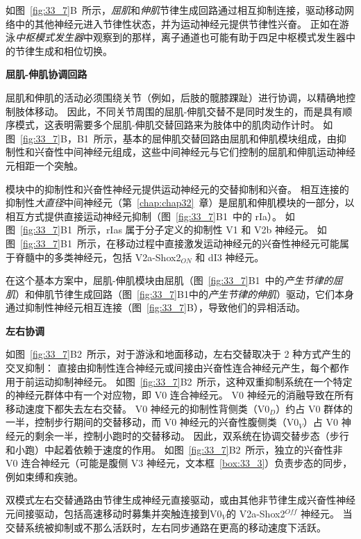 如图~\ref{fig:33_7}B~所示，\textit{屈肌}和\textit{伸肌}节律生成回路通过相互抑制连接，驱动移动网络中的其他神经元进入节律性状态，并为运动神经元提供节律性兴奋。
正如在游泳\textit{中枢模式发生器}中观察到的那样，离子通道也可能有助于四足中枢模式发生器中的节律生成和相位切换。


\textbf{屈肌-伸肌协调回路}

屈肌和伸肌的活动必须围绕关节（例如，后肢的髋膝踝趾）进行协调，以精确地控制肢体移动。
因此，不同关节周围的屈肌-伸肌交替不是同时发生的，而是具有顺序模式，这表明需要多个屈肌-伸肌交替回路来为肢体中的肌肉动作计时。
如图~\ref{fig:33_7}B，B1~所示，基本的屈伸肌交替回路由屈肌和伸肌模块组成，由抑制性和兴奋性中间神经元组成，这些中间神经元与它们控制的屈肌和伸肌运动神经元相距一个突触。


模块中的抑制性和兴奋性神经元提供运动神经元的交替抑制和兴奋。
相互连接的抑制性\textit{大直径}中间神经元（第~\ref{chap:chap32}~章）是屈肌和伸肌模块的一部分，以相互方式提供直接运动神经元抑制（图~\ref{fig:33_7}B1~中的 rIa）。
如图~\ref{fig:33_7}B1~所示，rIas 属于分子定义的抑制性 V1 和 V2b 神经元。
如图~\ref{fig:33_7}B1~所示，在移动过程中直接激发运动神经元的兴奋性神经元可能属于脊髓中的多类神经元，包括 V2a-Shox2$_{ON}$ 和 dI3 神经元。


在这个基本方案中，屈肌-伸肌模块由屈肌（图~\ref{fig:33_7}B1~中的\textit{产生节律的屈肌}）和伸肌节律生成回路（图~\ref{fig:33_7}B1中的\textit{产生节律的伸肌}）驱动，它们本身通过抑制性神经元相互连接（图~\ref{fig:33_7}B），导致他们的异相活动。


\textbf{左右协调}

如图~\ref{fig:33_7}B2~所示，对于游泳和地面移动，左右交替取决于 2 种方式产生的交叉抑制：
直接由抑制性连合神经元或间接由兴奋性连合神经元产生，每个都作用于前运动抑制神经元。
如图~\ref{fig:33_7}B2~所示，这种双重抑制系统在一个特定的神经元群体中有一个对应物，即 V0 连合神经元。
V0 神经元的消融导致在所有移动速度下都失去左右交替。
V0 神经元的抑制性背侧类（V0$_D$）约占 V0 群体的一半，控制步行期间的交替移动，而 V0 神经元的兴奋性腹侧类（V0$_V$）占 V0 神经元的剩余一半，控制小跑时的交替移动。
因此，双系统在协调交替步态（步行和小跑）中起着依赖于速度的作用。
如图~\ref{fig:33_7}B2~所示，独立的兴奋性非 V0 连合神经元（可能是腹侧 V3 神经元，文本框~\ref{box:33_3}）负责步态的同步，例如束缚和疾驰。


双模式左右交替通路由节律生成神经元直接驱动，或由其他非节律生成兴奋性神经元间接驱动，包括高速移动时募集并突触连接到V0$_V$的 V2a-Shox2$^{Off}$ 神经元。
当交替系统被抑制或不那么活跃时，左右同步通路在更高的移动速度下活跃。


